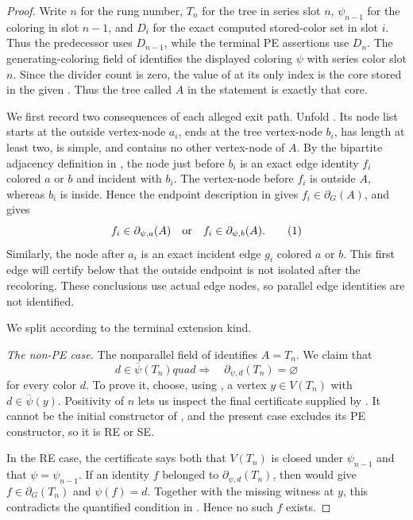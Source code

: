 \begin{proof}
Write $n$ for the rung number, $T_n$ for the tree in series slot $n$,
$\psi_{n-1}$ for the coloring in slot $n-1$, and $D_i$ for the exact
computed stored-color set in slot $i$.  Thus the predecessor uses
$D_{n-1}$, while the terminal PE assertions use $D_n$.  The
generating-coloring field of  identifies
the displayed coloring $\psi$ with series color slot $n$.  Since
the divider count is zero, the value of
 at its only index is the core stored in
the given .  Thus the tree called $A$ in the
statement is exactly that core.

We first record two consequences of each alleged exit path.  Unfold
.  Its node list starts at the outside vertex-node
$a_i$, ends at the tree vertex-node $b_i$, has length at least two, is
simple, and contains no other vertex-node of $A$.  By the bipartite
adjacency definition in , the node just
before $b_i$ is an exact edge identity $f_i$ colored $a$ or $b$ and
incident with $b_i$.  The vertex-node before $f_i$ is outside $A$,
whereas $b_i$ is inside.  Hence the endpoint description in
 gives $f_i\in\partial_G(A)$, and
 gives
\[
 f_i\in\partial_{\psi,a}(A)\quad\hbox{or}\quad
 f_i\in\partial_{\psi,b}(A).                         \tag{1}
\]
Similarly, the node after $a_i$ is an exact incident edge $g_i$ colored
$a$ or $b$.  This first edge will certify below that the outside endpoint
is not isolated after the recoloring.  These conclusions use actual edge
nodes, so parallel edge identities are not identified.

We split according to the terminal extension kind.

\emph{The non-PE case.}
The nonparallel field of  identifies
$A=T_n$.  We claim that
\[
 d\in\overline\psi(T_n)quad\Longrightarrow\quad
 \partial_{\psi,d}(T_n)=\varnothing                 \tag{2}
\]
for every color $d$.  To prove it, choose, using
, a vertex $y\in V(T_n)$ with
$d\in\overline\psi(y)$.  Positivity of $n$ lets us inspect the final
certificate supplied by .  It cannot be the
initial constructor of , and the present
case excludes its PE constructor, so it is RE or SE.

In the RE case, the certificate says both that $V(T_n)$ is closed under
$\psi_{n-1}$ and that $\psi=\psi_{n-1}$.  If an identity $f$ belonged to
$\partial_{\psi,d}(T_n)$, then
 would give
$f\in\partial_G(T_n)$ and $\psi(f)=d$.  Together with the missing witness
at $y$, this contradicts the quantified condition in
.  Hence no such $f$ exists.


\end{proof}
